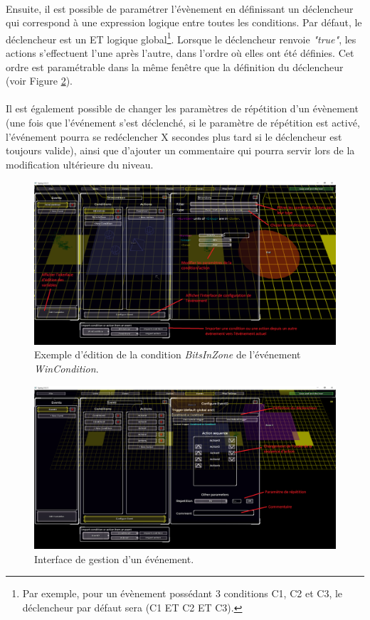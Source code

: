\documentclass[a4paper]{article}
\begin{document}
\paragraph{ }
Ensuite, il est possible de paramétrer l'évènement en définissant un déclencheur qui correspond à une expression logique entre toutes les conditions. Par défaut, le déclencheur est un ET logique global\footnote{Par exemple, pour un évènement possédant 3 conditions C1, C2 et C3, le déclencheur par défaut sera (C1 ET C2 ET C3).}. Lorsque le déclencheur renvoie \textit{"true"}, les actions s'effectuent l'une après l'autre, dans l'ordre où elles ont été définies. Cet ordre est paramétrable dans la même fenêtre que la définition du déclencheur (voir Figure \ref{fig:editor-eventconfig}).
\paragraph{ }
Il est également possible de changer les paramètres de répétition d'un évènement (une fois que l'événement s'est déclenché, si le paramètre de répétition est activé, l'événement pourra se redéclencher X secondes plus tard si le déclencheur est toujours valide), ainsi que d'ajouter un commentaire qui pourra servir lors de la modification ultérieure du niveau.
\begin{figure}[H]
\centering
\includegraphics[width=\linewidth]{editor-trigger.png}
\caption{Exemple d'édition de la condition \textit{BitsInZone} de l'événement \textit{WinCondition}.}
\label{fig:editor-trigger}
\end{figure}
\begin{figure}[H]
\centering
\includegraphics[width=\linewidth]{editor-eventconfig.png}
\caption{Interface de gestion d'un événement.}
\label{fig:editor-eventconfig}
\end{figure}
\end{document}

